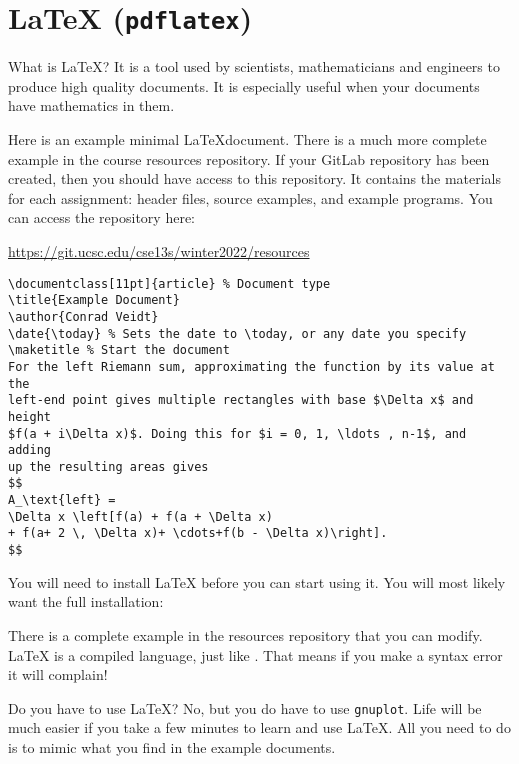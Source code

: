 \section{\LaTeX{} (\texttt{pdflatex})}

What is \LaTeX? It is a tool used by scientists, mathematicians and
engineers to produce high quality documents. It is especially
useful when your documents have mathematics in them.

Here is an example minimal \LaTeX document. There is a much more
complete example in the course resources repository. If your GitLab repository
has been created, then you should have access to this repository. It contains
the materials for each assignment: header files, source examples, and example
programs. You can access the repository here:

\centerline{\url{https://git.ucsc.edu/cse13s/winter2022/resources}}

\begin{verbatim}
\documentclass[11pt]{article} % Document type
\title{Example Document}
\author{Conrad Veidt}
\date{\today} % Sets the date to \today, or any date you specify
\maketitle % Start the document
For the left Riemann sum, approximating the function by its value at the
left-end point gives multiple rectangles with base $\Delta x$ and height
$f(a + i\Delta x)$. Doing this for $i = 0, 1, \ldots , n-1$, and adding
up the resulting areas gives
$$
A_\text{left} =
\Delta x \left[f(a) + f(a + \Delta x)
+ f(a+ 2 \, \Delta x)+ \cdots+f(b - \Delta x)\right].
$$

\end{verbatim}

You will need to install \LaTeX{} before you can start using it. You will most
likely want the full installation:


There is a complete example in the resources repository that you can modify.
\LaTeX{} is a compiled language, just like \C{}. That means if you make a syntax
error it will complain!

Do you have to use \LaTeX? No, but you do have to use \texttt{gnuplot}.
Life will be much easier if you take a few minutes to learn and use
\LaTeX{}. All you need to do is to mimic what you find in the example
documents.
